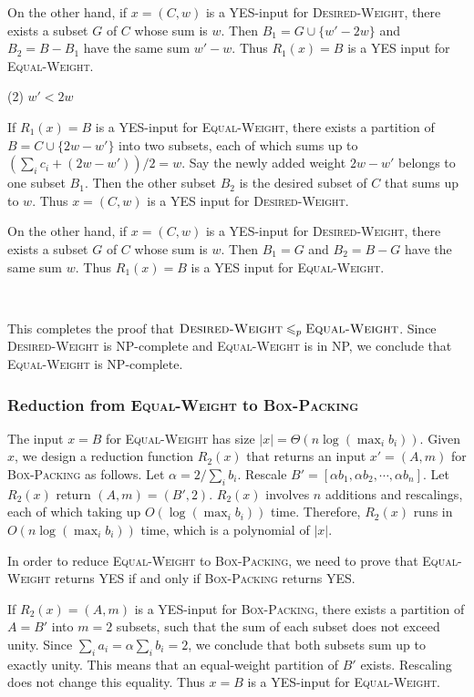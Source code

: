 \documentclass{article}
\begin{document}
On the other hand, if $x=(C,w)$ is a YES-input for \textsc{Desired-Weight}, there exists a subset $G$ of $C$ whose sum is $w$. Then $B_1=G\cup\{w'-2w\}$ and $B_2=B-B_1$ have the same sum $w'-w$. Thus $R_1(x)=B$ is a YES input for \textsc{Equal-Weight}.

\noindent(2) $w'<2w$

If $R_1(x)=B$ is a YES-input for \textsc{Equal-Weight}, there exists a partition of $B=C\cup\{2w-w'\}$ into two subsets, each of which sums up to $(\sum_ic_i+(2w-w'))/2=w$. Say the newly added weight $2w-w'$ belongs to one subset $B_1$. Then the other subset $B_2$ is the desired subset of $C$ that sums up to $w$. Thus $x=(C,w)$ is a YES input for \textsc{Desired-Weight}.

On the other hand, if $x=(C,w)$ is a YES-input for \textsc{Desired-Weight}, there exists a subset $G$ of $C$ whose sum is $w$. Then $B_1=G$ and $B_2=B-G$ have the same sum $w$. Thus $R_1(x)=B$ is a YES input for \textsc{Equal-Weight}.

~

This completes the proof that $\textsc{Desired-Weight}\leqslant_p\textsc{Equal-Weight}$. Since \textsc{Desired-Weight} is NP-complete and \textsc{Equal-Weight} is in NP, we conclude that \textsc{Equal-Weight} is NP-complete.

\subsubsection{Reduction from \textsc{Equal-Weight} to \textsc{Box-Packing}}
The input $x=B$ for \textsc{Equal-Weight} has size $|x|=\Theta(n\log(\max_ib_i))$. Given $x$, we design a reduction function $R_2(x)$ that returns an input $x'=(A,m)$ for \textsc{Box-Packing} as follows. Let $\alpha=2/\sum_ib_i$. Rescale $B'=[\alpha b_1,\alpha b_2,\cdots,\alpha b_n]$. Let $R_2(x)$ return $(A,m)=(B',2)$. $R_2(x)$ involves $n$ additions and rescalings, each of which taking up $O(\log(\max_ib_i))$ time. Therefore, $R_2(x)$ runs in $O(n\log(\max_ib_i))$ time, which is a polynomial of $|x|$.

In order to reduce \textsc{Equal-Weight} to \textsc{Box-Packing}, we need to prove that \textsc{Equal-Weight} returns YES if and only if \textsc{Box-Packing} returns YES.

If $R_2(x)=(A,m)$ is a YES-input for \textsc{Box-Packing}, there exists a partition of $A=B'$ into $m=2$ subsets, such that the sum of each subset does not exceed unity. Since $\sum_ia_i=\alpha\sum_ib_i=2$, we conclude that both subsets sum up to exactly unity. This means that an equal-weight partition of $B'$ exists. Rescaling does not change this equality. Thus $x=B$ is a YES-input for \textsc{Equal-Weight}.
\end{document}
